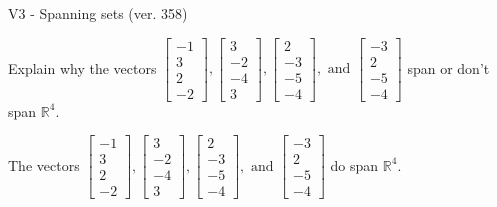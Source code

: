 \begin{exercise}
  \begin{exerciseTitle}V3 - Spanning sets (ver. 358)\end{exerciseTitle}
  \begin{exerciseStatement}
    Explain why the vectors \(\left[\begin{array}{r}
-1 \\
3 \\
2 \\
-2
\end{array}\right] , \left[\begin{array}{r}
3 \\
-2 \\
-4 \\
3
\end{array}\right] , \left[\begin{array}{r}
2 \\
-3 \\
-5 \\
-4
\end{array}\right] , \text{ and } \left[\begin{array}{r}
-3 \\
2 \\
-5 \\
-4
\end{array}\right]\) span or don't span \(\mathbb{R}^4\). 
	


  \end{exerciseStatement}
  \begin{exerciseAnswer}
   The vectors \(\left[\begin{array}{r}
-1 \\
3 \\
2 \\
-2
\end{array}\right] , \left[\begin{array}{r}
3 \\
-2 \\
-4 \\
3
\end{array}\right] , \left[\begin{array}{r}
2 \\
-3 \\
-5 \\
-4
\end{array}\right] , \text{ and } \left[\begin{array}{r}
-3 \\
2 \\
-5 \\
-4
\end{array}\right]\) 
  	 do  
	span \(\mathbb{R}^4\).
  


  \end{exerciseAnswer}
\end{exercise}